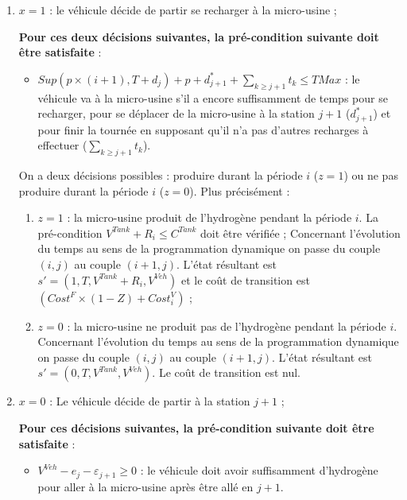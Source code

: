 \begin{enumerate}
	\item $x=1$ : le véhicule décide de partir se recharger à la micro-usine ;
	
	\textbf{Pour ces deux décisions suivantes, la pré-condition suivante doit être satisfaite} :
	
	\begin{itemize}[label=$\square$]
		\item $Sup(p \times (i+1), T+d_j) +p+d^*_{j+1} + \sum_{k\geq j+1}t_k \leq TMax$ : le véhicule va à la micro-usine s'il a encore suffisamment de temps pour se recharger, pour se déplacer de la micro-usine à la station $j+1$ ($d^*_{j+1}$) et pour finir la tournée en supposant qu'il n'a pas d'autres recharges à effectuer ($\sum_{k\geq j+1}t_k$).
		
	\end{itemize}
	
	On a deux décisions possibles : produire durant la période $i$ ($z=1$) ou ne pas produire durant la période $i$ ($z=0$). Plus précisément :
	\begin{enumerate}[label=\arabic*)]
		\item $z=1$ : la micro-usine produit de l'hydrogène pendant la période $i$. La pré-condition $V^{Tank} + R_i \leq C^{Tank}$ doit être vérifiée ; 				
		Concernant l'évolution du temps au sens de la programmation dynamique on passe du couple $(i, j)$ au couple $(i + 1, j)$. L'état résultant est $s'= (1, T, V^{Tank} + R_i, V^{Veh})$ et le coût de transition est $(Cost^F\times (1-Z) + Cost^V_i)$ ;
		
		\item $z=0$ : la micro-usine ne produit pas de l'hydrogène pendant la période $i$.
		Concernant l'évolution du temps au sens de la programmation dynamique on passe du couple $(i, j)$ au couple $(i + 1, j)$. L'état résultant est $s'= (0, T, V^{Tank}, V^{Veh})$. Le coût de transition est nul.
	\end{enumerate}
	
	\item $x=0$ : Le véhicule décide de partir à la station $j+1$ ;
	
	\textbf{Pour ces décisions suivantes, la pré-condition suivante doit être satisfaite} :
	
	\begin{itemize}[label=$\square$]
		\item $V^{Veh}-e_j-\varepsilon_{j+1} \geq 0$ : le véhicule doit avoir suffisamment d'hydrogène pour aller à la micro-usine après être allé en $j+1$.
		

\end{itemize}
\end{enumerate}
